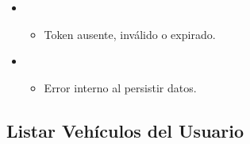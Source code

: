\documentclass[a4paper,11pt,spanish]{sphinxmanual}
\begin{document}
\begin{fulllineitems}
\begin{itemize}
\item {} 
\sphinxAtStartPar
{}
\begin{itemize}
\item {} 
\sphinxAtStartPar
Token ausente, inválido o expirado.

\end{itemize}

\begin{sphinxVerbatim}[commandchars=\\\{\}]
\end{sphinxVerbatim}

\item {} 
\sphinxAtStartPar
{}
\begin{itemize}
\item {} 
\sphinxAtStartPar
Error interno al persistir datos.

\end{itemize}

\end{itemize}

\end{fulllineitems}



\subsection{Listar Vehículos del Usuario}
\label{\detokenize{endpoints:listar-vehiculos-del-usuario}}
\end{document}
